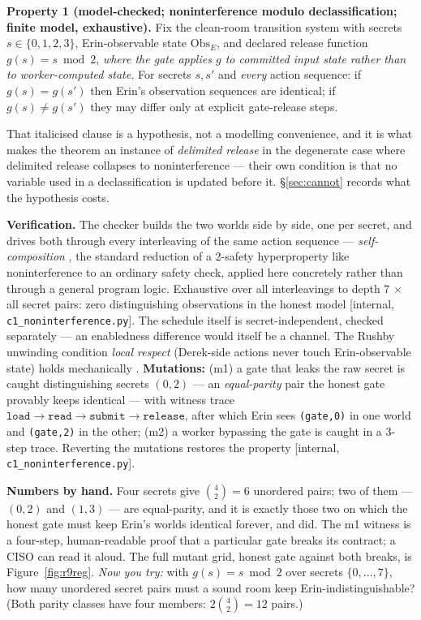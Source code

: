 \documentclass[11pt,a4paper]{article}
\begin{document}
\begin{thebox}
\textbf{Property 1 (model-checked; noninterference modulo declassification; finite model, exhaustive).} Fix the clean-room transition system with
secrets $s\in\{0,1,2,3\}$, Erin-observable state $\mathrm{Obs}_E$, and declared release function $g(s)=s\bmod 2$, \emph{where the
gate applies $g$ to committed input state rather than to worker-computed state.} For secrets $s,s'$ and \emph{every} action
sequence: if $g(s)=g(s')$ then Erin's observation sequences are identical; if $g(s)\neq g(s')$ they may differ only at explicit
gate-release steps.

That italicised clause is a hypothesis, not a modelling convenience, and it is what makes the theorem an instance of
\emph{delimited release} \cite{sm03} in the degenerate case where delimited release collapses to noninterference --- their own
condition is that no variable used in a declassification is updated before it. \S\ref{sec:cannot} records what the hypothesis
costs.

\textbf{Verification.} The checker builds the two worlds side by side, one per secret, and drives both through every interleaving
of the same action sequence --- \emph{self-composition} \cite{bdr04}, the standard reduction of a 2-safety hyperproperty like
noninterference to an ordinary safety check, applied here concretely rather than through a general program logic. Exhaustive over
all interleavings to depth 7 $\times$ all secret pairs: zero distinguishing observations in
the honest model [internal, \texttt{c1\_noninterference.py}]. The schedule itself is secret-independent, checked separately --- an
enabledness difference would itself be a channel. The Rushby unwinding condition \emph{local respect} (Derek-side actions never
touch Erin-observable state) holds mechanically \cite{rushby}. \textbf{Mutations:} (m1) a gate that leaks the raw secret is caught
distinguishing secrets $(0,2)$ --- an \emph{equal-parity} pair the honest gate provably keeps identical --- with witness trace
$\mathtt{load}\to\mathtt{read}\to\mathtt{submit}\to\mathtt{release}$, after which Erin sees \texttt{(gate,0)} in one world and
\texttt{(gate,2)} in the other; (m2) a worker bypassing the gate is caught in a 3-step trace. Reverting the mutations restores the
property [internal, \texttt{c1\_noninterference.py}].
\end{thebox}

\textbf{Numbers by hand.} Four secrets give $\binom{4}{2}=6$ unordered pairs; two of them --- $(0,2)$ and $(1,3)$ --- are
equal-parity, and it is exactly those two on which the honest gate must keep Erin's worlds identical forever, and did. The m1
witness is a four-step, human-readable proof that a particular gate breaks its contract; a CISO can read it aloud. The full mutant
grid, honest gate against both breaks, is Figure~\ref{fig:r9reg}.
\emph{Now you try:} with $g(s)=s\bmod 2$ over secrets $\{0,\dots,7\}$, how many unordered secret pairs must a sound room keep
Erin-indistinguishable? (Both parity classes have four members: $2\binom{4}{2}=12$ pairs.)
\end{document}
